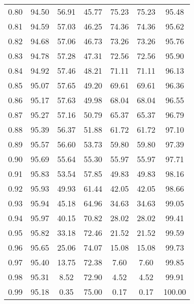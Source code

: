 \begin{tabular}{|c|c|c|c|c|c|c|}
      0.80 &     94.50 &     56.91 &      45.77 &   75.23 &      75.23 &         95.48 \\
      0.81 &     94.59 &     57.03 &      46.25 &   74.36 &      74.36 &         95.62 \\
      0.82 &     94.68 &     57.06 &      46.73 &   73.26 &      73.26 &         95.76 \\
      0.83 &     94.78 &     57.28 &      47.31 &   72.56 &      72.56 &         95.90 \\
      0.84 &     94.92 &     57.46 &      48.21 &   71.11 &      71.11 &         96.13 \\
      0.85 &     95.07 &     57.65 &      49.20 &   69.61 &      69.61 &         96.36 \\
      0.86 &     95.17 &     57.63 &      49.98 &   68.04 &      68.04 &         96.55 \\
      0.87 &     95.27 &     57.16 &      50.79 &   65.37 &      65.37 &         96.79 \\
      0.88 &     95.39 &     56.37 &      51.88 &   61.72 &      61.72 &         97.10 \\
      0.89 &     95.57 &     56.60 &      53.73 &   59.80 &      59.80 &         97.39 \\
      0.90 &     95.69 &     55.64 &      55.30 &   55.97 &      55.97 &         97.71 \\
      0.91 &     95.83 &     53.54 &      57.85 &   49.83 &      49.83 &         98.16 \\
      0.92 &     95.93 &     49.93 &      61.44 &   42.05 &      42.05 &         98.66 \\
      0.93 &     95.94 &     45.18 &      64.96 &   34.63 &      34.63 &         99.05 \\
      0.94 &     95.97 &     40.15 &      70.82 &   28.02 &      28.02 &         99.41 \\
      0.95 &     95.82 &     33.18 &      72.46 &   21.52 &      21.52 &         99.59 \\
      0.96 &     95.65 &     25.06 &      74.07 &   15.08 &      15.08 &         99.73 \\
      0.97 &     95.40 &     13.75 &      72.38 &    7.60 &       7.60 &         99.85 \\
      0.98 &     95.31 &      8.52 &      72.90 &    4.52 &       4.52 &         99.91 \\
      0.99 &     95.18 &      0.35 &      75.00 &    0.17 &       0.17 &        100.00 \\
\bottomrule
\end{tabular}
